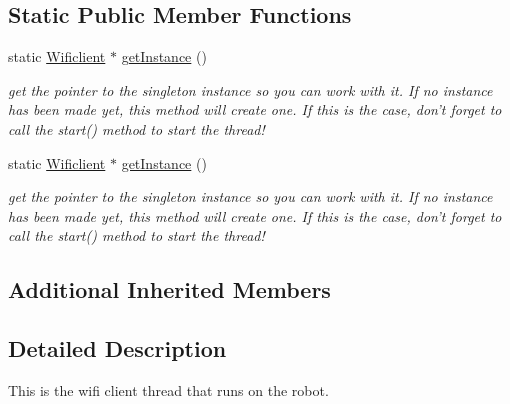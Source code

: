 \subsection*{Static Public Member Functions}
\begin{DoxyCompactItemize}
\item 
\hypertarget{class_wificlient_a2c13f6bc7687f8ecd6fde0abe803d2a0}{static \hyperlink{class_wificlient}{Wificlient} $\ast$ \hyperlink{class_wificlient_a2c13f6bc7687f8ecd6fde0abe803d2a0}{get\-Instance} ()}\label{class_wificlient_a2c13f6bc7687f8ecd6fde0abe803d2a0}

\begin{DoxyCompactList}\small\item\em get the pointer to the singleton instance so you can work with it. If no instance has been made yet, this method will create one. If this is the case, don't forget to call the start() method to start the thread! \end{DoxyCompactList}\item 
\hypertarget{class_wificlient_a0a7612d4c7ff6f8809027d46d5fb5d7b}{static \hyperlink{class_wificlient}{Wificlient} $\ast$ \hyperlink{class_wificlient_a0a7612d4c7ff6f8809027d46d5fb5d7b}{get\-Instance} ()}\label{class_wificlient_a0a7612d4c7ff6f8809027d46d5fb5d7b}

\begin{DoxyCompactList}\small\item\em get the pointer to the singleton instance so you can work with it. If no instance has been made yet, this method will create one. If this is the case, don't forget to call the start() method to start the thread! \end{DoxyCompactList}\end{DoxyCompactItemize}
\subsection*{Additional Inherited Members}


\subsection{Detailed Description}
This is the wifi client thread that runs on the robot. 

